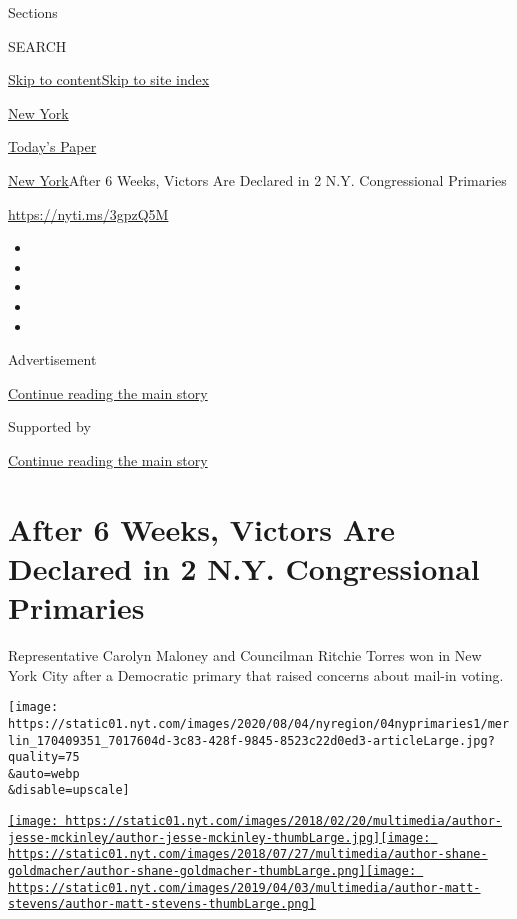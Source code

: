 Sections

SEARCH

\protect\hyperlink{site-content}{Skip to
content}\protect\hyperlink{site-index}{Skip to site index}

\href{https://www.nytimes.com/section/nyregion}{New York}

\href{https://myaccount.nytimes.com/auth/login?response_type=cookie\&client_id=vi}{}

\href{https://www.nytimes.com/section/todayspaper}{Today's Paper}

\href{/section/nyregion}{New York}\textbar{}After 6 Weeks, Victors Are
Declared in 2 N.Y. Congressional Primaries

\url{https://nyti.ms/3gpzQ5M}

\begin{itemize}
\item
\item
\item
\item
\item
\end{itemize}

Advertisement

\protect\hyperlink{after-top}{Continue reading the main story}

Supported by

\protect\hyperlink{after-sponsor}{Continue reading the main story}

\hypertarget{after-6-weeks-victors-are-declared-in-2-ny-congressional-primaries}{%
\section{After 6 Weeks, Victors Are Declared in 2 N.Y. Congressional
Primaries}\label{after-6-weeks-victors-are-declared-in-2-ny-congressional-primaries}}

Representative Carolyn Maloney and Councilman Ritchie Torres won in New
York City after a Democratic primary that raised concerns about mail-in
voting.

\texttt{[image: https://static01.nyt.com/images/2020/08/04/nyregion/04nyprimaries1/merlin\_170409351\_7017604d-3c83-428f-9845-8523c22d0ed3-articleLarge.jpg?quality=75\\\&auto=webp\\\&disable=upscale]}

\href{https://www.nytimes.com/by/jesse-mckinley}{\texttt{[image: https://static01.nyt.com/images/2018/02/20/multimedia/author-jesse-mckinley/author-jesse-mckinley-thumbLarge.jpg]}}\href{https://www.nytimes.com/by/shane-goldmacher}{\texttt{[image: https://static01.nyt.com/images/2018/07/27/multimedia/author-shane-goldmacher/author-shane-goldmacher-thumbLarge.png]}}\href{https://www.nytimes.com/by/matt-stevens}{\texttt{[image: https://static01.nyt.com/images/2019/04/03/multimedia/author-matt-stevens/author-matt-stevens-thumbLarge.png]}}

